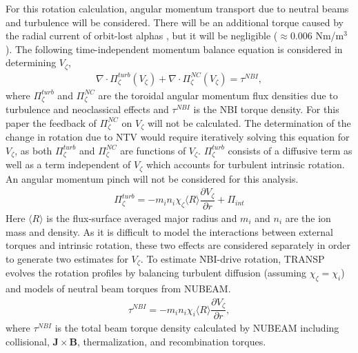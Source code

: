 \documentclass{article}
\numberwithin{figure}{section}
\numberwithin{equation}{section}
\newcommand{\partder}[2]{\dfrac{\partial  #1}{\partial  #2}} %
\begin{document}
For this rotation calculation, angular momentum transport due to neutral beams and turbulence will be considered. There will be an additional torque caused by the radial current of orbit-lost alphas \cite{Rosenbluth1996}, but it will be negligible ($\approx 0.006$ Nm/m$^3$). The following time-independent momentum balance equation is considered in determining $V_{\zeta}$,
\begin{gather}
\nabla \cdot \Pi_{\zeta}^{turb}(V_{\zeta}) + \nabla \cdot \Pi_{\zeta}^{NC}(V_{\zeta}) = \tau^{NBI},
\end{gather}
where $\Pi^{turb}_{\zeta}$ and $\Pi^{NC}_{\zeta}$ are the toroidal angular momentum flux densities due to turbulence and neoclassical effects and $\tau^{NBI}$ is the NBI torque density. For this paper the feedback of $\Pi_{\zeta}^{NC}$ on $V_{\zeta}$ will not be calculated. The determination of the change in rotation due to NTV would require iteratively solving this equation for $V_{\zeta}$, as both $\Pi_{\zeta}^{turb}$ and $\Pi_{\zeta}^{NC}$ are functions of $V_{\zeta}$. $\Pi_{\zeta}^{turb}$ consists of a diffusive term as well as a term independent of $V_{\zeta}$ which accounts for turbulent intrinsic rotation. An angular momentum pinch will not be considered for this analysis. 
\begin{gather}
\Pi_{\zeta}^{turb} = -m_i n_i \chi_{\zeta} \langle R \rangle\partder{V_{\zeta}}{r} + \Pi_{int}
\end{gather}
Here $\langle R \rangle$ is the flux-surface averaged major radius and $m_i$ and $n_i$ are the ion mass and density. As it is difficult to model the interactions between external torques and intrinsic rotation, these two effects are considered separately in order to generate two estimates for $V_{\zeta}$. To estimate NBI-drive rotation, TRANSP evolves the rotation profiles by balancing turbulent diffusion (assuming $\chi_{\zeta} = \chi_{i}$) and models of neutral beam torques from NUBEAM. 
\begin{gather}
\tau^{NBI} = -m_i n_i \chi_{i} \langle R \rangle \partder{V_{\zeta}}{r},
\end{gather}
where $\tau^{NBI}$ is the total beam torque density calculated by NUBEAM including collisional, $\bm{J} \times \bm{B}$, thermalization, and recombination torques.
\end{document}
